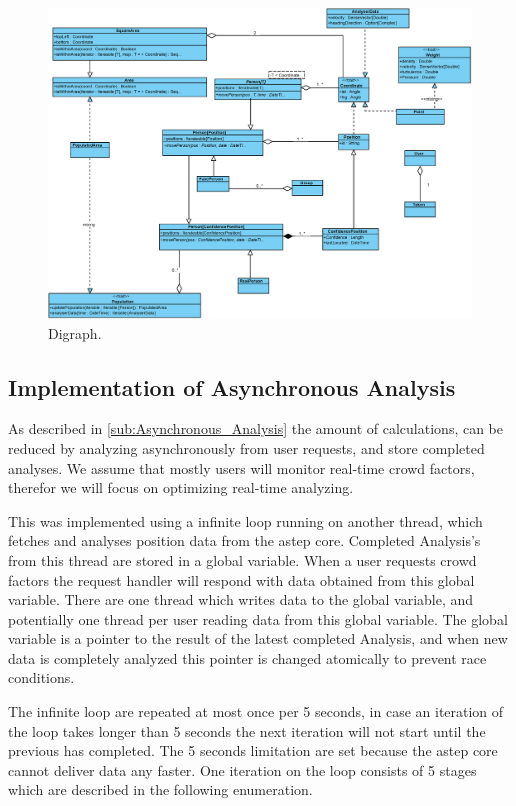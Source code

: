 \begin{figure}
\centering
\includegraphics[width=\linewidth]{figures/class.eps}
\caption{Digraph.}
\label{fig:class}
\end{figure}


\subsection{Implementation of Asynchronous Analysis}
\label{sub:implementation_of_asynchronous_analysis}

As described in \cref{sub:Asynchronous_Analysis} the amount of calculations, can be reduced by analyzing asynchronously from user requests, and store completed analyses. We assume that mostly users will monitor real-time crowd factors, therefor we will focus on optimizing real-time analyzing.

This was implemented using a infinite loop running on another thread, which fetches and analyses position data from the astep core. Completed Analysis's from this thread are stored in a global variable. When a user requests crowd factors the request handler will respond with data obtained from this global variable. There are one thread which writes data to the global variable, and potentially one thread per user reading data from this global variable. The global variable is a pointer to the result of the latest completed Analysis, and when new data is completely analyzed this pointer is changed atomically to prevent race conditions. 

The infinite loop are repeated at most once per 5 seconds, in case an iteration of the loop takes longer than 5 seconds the next iteration will not start until the previous has completed. The 5 seconds limitation are set because the astep core cannot deliver data any faster. One iteration on the loop consists of 5 stages which are described in the following enumeration. 

